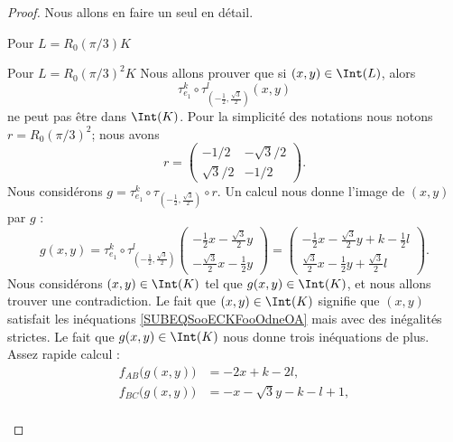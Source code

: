 \begin{proof}
	Nous allons en faire un seul en détail.
	\begin{subproof}
		\item[Pour \( L=R_0(\pi/3)K\)]
		\item[Pour \( L=R_0(\pi/3)^2K\)]
		Nous allons prouver que si \( (x,y)\in \Int(L)\), alors
		\begin{equation}
			\tau_{e_1}^k\circ \tau_{(-\frac{ 1 }{2},\frac{ \sqrt{ 3 } }{2})}^l(x,y)
		\end{equation}
		ne peut pas être dans \( \Int(K)\). Pour la simplicité des notations nous notons \( r=R_0(\pi/3)^2\); nous avons
		\begin{equation}
			r=\begin{pmatrix}
				-1/2         & -\sqrt{ 3 }/2 \\
				\sqrt{ 3 }/2 & -1/2
			\end{pmatrix}.
		\end{equation}
		Nous considérons \( g=\tau_{e_1}^k\circ\tau_{(-\frac{ 1 }{2},\frac{ \sqrt{ 3 } }{2})}\circ r\). Un calcul nous donne l'image de \( (x,y)\) par \( g\) :
		\begin{equation}
			g(x,y)=\tau_{e_1}^k\circ\tau_{(-\frac{ 1 }{2},\frac{ \sqrt{ 3 } }{2})}^l\begin{pmatrix}
				-\frac{ 1 }{2}x-\frac{ \sqrt{ 3 } }{2}y \\
				-\frac{ \sqrt{ 3 } }{2}x-\frac{ 1 }{2}y
			\end{pmatrix}=\begin{pmatrix}
				-\frac{ 1 }{2}x-\frac{ \sqrt{ 3 } }{2}y+k-\frac{ 1 }{2}l \\
				\frac{ \sqrt{ 3 } }{2}x-\frac{ 1 }{2}y+\frac{ \sqrt{ 3 } }{2}l
			\end{pmatrix}.
		\end{equation}
		Nous considérons \( (x,y)\in \Int(K)\) tel que \( g(x,y)\in \Int(K)\), et nous allons trouver une contradiction. Le fait que \( (x,y)\in \Int(K)\) signifie que \( (x,y)\) satisfait les inéquations \eqref{SUBEQSooECKFooOdneOA} mais avec des inégalités strictes. Le fait que \( g(x,y)\in\Int(K)\) nous donne trois inéquations de plus. Assez rapide calcul :
		\begin{subequations}
			\begin{align}
				f_{AB}\big( g(x,y) \big) & =-2x+k-2l,                                                       \\
				f_{BC}\big( g(x,y) \big) & =-x-\sqrt{ 3 }y-k-l+1,                                           \\

\end{align}
\end{subequations}
\end{subproof}
\end{proof}
